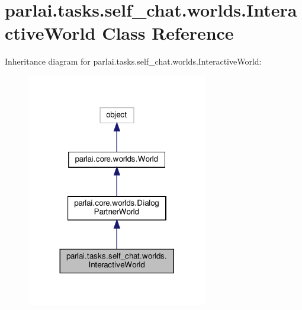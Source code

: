 \hypertarget{classparlai_1_1tasks_1_1self__chat_1_1worlds_1_1InteractiveWorld}{}\section{parlai.\+tasks.\+self\+\_\+chat.\+worlds.\+Interactive\+World Class Reference}
\label{classparlai_1_1tasks_1_1self__chat_1_1worlds_1_1InteractiveWorld}


Inheritance diagram for parlai.\+tasks.\+self\+\_\+chat.\+worlds.\+Interactive\+World\+:
\nopagebreak
\begin{figure}[H]
\begin{center}
\leavevmode
\includegraphics[width=224pt]{dc/d50/classparlai_1_1tasks_1_1self__chat_1_1worlds_1_1InteractiveWorld__inherit__graph}
\end{center}
\end{figure}


